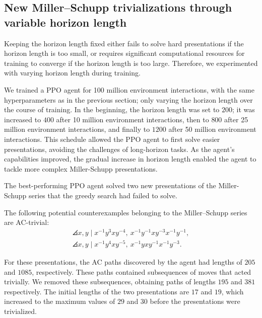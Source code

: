 \subsection{New Miller--Schupp trivializations through variable horizon length}\label{sec:variable_horizon}

Keeping the horizon length fixed either fails to solve hard presentations if the horizon length is too small, or requires significant computational resources for training to converge if the horizon length is too large. Therefore, we experimented with varying horizon length during training. 

We trained a PPO agent for 100 million environment interactions, with the same hyperparameters as in the previous section; only varying the horizon length over the course of training. In the beginning, the horizon length was set to $200$; it was increased to $400$ after 10 million environment interactions, then to $800$ after 25 million environment interactions, and finally to $1200$ after 50 million environment interactions.
This schedule allowed the PPO agent to first solve easier presentations, avoiding the challenges of long-horizon tasks. As the agent’s capabilities improved, the gradual increase in horizon length enabled the agent to tackle more complex Miller-Schupp presentations.

The best-performing PPO agent solved two new presentations of the Miller-Schupp series that the greedy search had failed to solve.

\begin{theorem}\label{thm:MS}
    The following potential counterexamples belonging to the Miller--Schupp series are AC-trivial:
	\begin{gather*}
		\angles{x, y \mid x^{-1} y^3 x y^{-4} , \ x^{-1} y^{-1} x y^{-3} x^{-1} y^{-1}}, \\
		\angles{x, y \mid x^{-1} y^4 x y^{-5} , \ x^{-1} y x y^{-1} x^{-1} y^{-3}}.
	\end{gather*}
\end{theorem}

For these presentations, the AC paths discovered by the agent had lengths of $205$ and $1085$, respectively. These paths contained subsequences of moves that acted trivially. We removed these subsequences, obtaining paths of lengths $195$ and $381$ respectively. The initial lengths of the two presentations are $17$ and $19$, which increased to the maximum values of $29$ and $30$ before the presentations were trivialized. 

